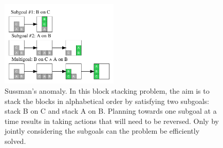 \documentclass[10pt,letterpaper]{article}
\newcommand{\todo}[1]{\textcolor{red}{\textsc{[TODO: #1]}}}
\begin{document}



\begin{figure}[ht!]
    \centering
    \includegraphics[width=0.5\textwidth]{example-suss}
    \caption{Sussman's anomaly. In this block stacking problem, the aim is to stack the blocks in alphabetical order by satisfying two subgoals: stack B on C and stack A on B. Planning towards one subgoal at a time results in taking actions that will need to be reversed. Only by jointly considering the subgoals can the problem be efficiently solved.}
    \label{fig:suss}
\end{figure}
\end{document}
